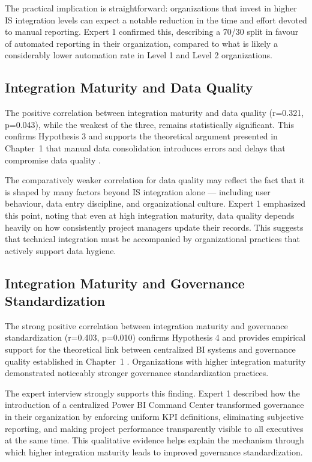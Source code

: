 The practical implication is straightforward: organizations that invest
in higher IS integration levels can expect a notable reduction in the
time and effort devoted to manual reporting. Expert 1 confirmed this,
describing a 70/30 split in favour of automated reporting in their
organization, compared to what is likely a considerably lower automation
rate in Level 1 and Level 2 organizations.

\subsection{Integration Maturity and Data Quality}
The positive correlation between integration maturity and data quality
(r=0.321, p=0.043), while the weakest of the three, remains statistically
significant. This confirms Hypothesis 3 and supports the theoretical
argument presented in Chapter~1 that manual data consolidation introduces
errors and delays that compromise data quality \cite{dama2017}.

The comparatively weaker correlation for data quality may reflect the
fact that it is shaped by many factors beyond IS integration alone ---
including user behaviour, data entry discipline, and organizational
culture. Expert 1 emphasized this point, noting that even at high
integration maturity, data quality depends heavily on how consistently
project managers update their records. This suggests that technical
integration must be accompanied by organizational practices that
actively support data hygiene.

\subsection{Integration Maturity and Governance Standardization}
The strong positive correlation between integration maturity and
governance standardization (r=0.403, p=0.010) confirms Hypothesis 4
and provides empirical support for the theoretical link between
centralized BI systems and governance quality established in
Chapter~1 \cite{negash2004}. Organizations with higher integration
maturity demonstrated noticeably stronger governance standardization
practices.

The expert interview strongly supports this finding. Expert 1 described
how the introduction of a centralized Power BI Command Center transformed
governance in their organization by enforcing uniform KPI definitions,
eliminating subjective reporting, and making project performance
transparently visible to all executives at the same time. This
qualitative evidence helps explain the mechanism through which higher
integration maturity leads to improved governance standardization.

